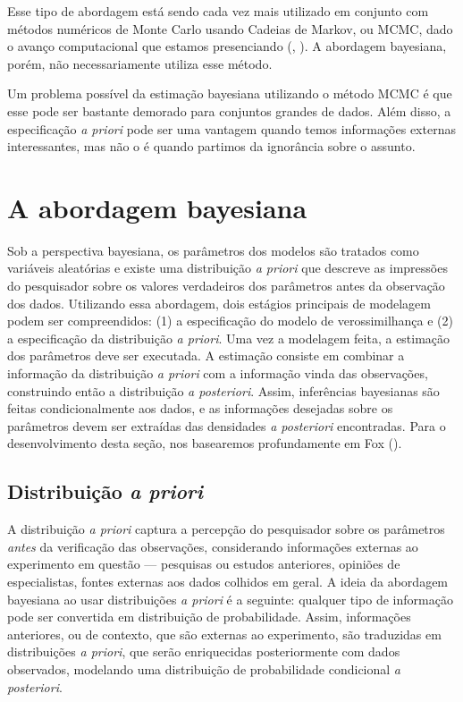 \documentclass[
	12pt,				%
	openright,			%
	twoside,			%
	a4paper,			%
	english,			%
	brazil				%
	]{abntex2}
\begin{document}
 Esse tipo de abordagem está sendo cada vez mais utilizado em conjunto com métodos numéricos de Monte Carlo usando Cadeias de Markov, ou MCMC, dado o avanço computacional que estamos presenciando (, \citeyear{campos2016}). A abordagem bayesiana, porém, não necessariamente utiliza esse método.
 
 Um problema possível da estimação bayesiana utilizando o método MCMC é que esse pode ser bastante demorado para conjuntos grandes de dados. Além disso, a especificação \textit{a priori} pode ser uma vantagem quando temos informações externas interessantes, mas não o é quando partimos da ignorância sobre o assunto.
 
 \section{A abordagem bayesiana}
 Sob a perspectiva bayesiana, os parâmetros dos modelos são tratados como variáveis aleatórias e existe uma distribuição \emph{a priori} que descreve as impressões do pesquisador sobre os valores verdadeiros dos parâmetros antes da observação dos dados. Utilizando essa abordagem, dois estágios principais de modelagem podem ser compreendidos: (1) a especificação do modelo de verossimilhança e (2) a especificação da distribuição \emph{a priori}. Uma vez a modelagem feita, a estimação dos parâmetros deve ser executada. A estimação consiste em combinar a informação da distribuição \emph{a priori} com a informação vinda das observações, construindo então a distribuição \emph{a posteriori}. Assim, inferências bayesianas são feitas condicionalmente aos dados, e as informações desejadas sobre os parâmetros devem ser extraídas das densidades \emph{a posteriori} encontradas. Para o desenvolvimento desta seção, nos basearemos profundamente em Fox (\citeyear{fox2010}).
 
 \subsection{Distribuição \emph{a priori}}
 A distribuição \emph{a priori} captura a percepção do pesquisador sobre os parâmetros \emph{antes} da verificação das observações, considerando informações externas ao experimento em questão --- pesquisas ou estudos anteriores, opiniões de especialistas, fontes externas aos dados colhidos em geral. A ideia da abordagem bayesiana ao usar distribuições \emph{a priori} é a seguinte: qualquer tipo de informação pode ser convertida em distribuição de probabilidade. Assim, informações anteriores, ou de contexto, que são externas ao experimento, são traduzidas em distribuições \emph{a priori}, que serão enriquecidas posteriormente com dados observados, modelando uma distribuição de probabilidade condicional \emph{a posteriori}.
 
\end{document}
